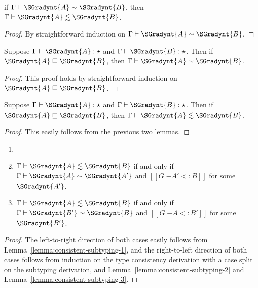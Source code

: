 \begin{lemma}
  \label{lemma:consistent-subtyping-3}
  if $ \Gamma  \vdash  \SGradynt{A}  \sim  \SGradynt{B} $, then $ \Gamma  \vdash  \SGradynt{A}  \lesssim  \SGradynt{B} $.
\end{lemma}
\begin{proof}
  By straightforward induction on $ \Gamma  \vdash  \SGradynt{A}  \sim  \SGradynt{B} $.
\end{proof}

\begin{lemma}
  \label{lemma:type_precision_and_consistency}
  Suppose $ \Gamma  \vdash  \SGradynt{A}  : \star $ and $ \Gamma  \vdash  \SGradynt{B}  : \star $.  Then
  if $ \SGradynt{A}  \sqsubseteq  \SGradynt{B} $, then $ \Gamma  \vdash  \SGradynt{A}  \sim  \SGradynt{B} $.
\end{lemma}
\begin{proof}
  This proof holds by straightforward induction on $ \SGradynt{A}  \sqsubseteq  \SGradynt{B} $.
\end{proof}

\begin{corollary}
  \label{corollary:type_precision_and_subtyping}
  Suppose $ \Gamma  \vdash  \SGradynt{A}  : \star $ and $ \Gamma  \vdash  \SGradynt{B}  : \star $.  Then
  if $ \SGradynt{A}  \sqsubseteq  \SGradynt{B} $, then $ \Gamma  \vdash  \SGradynt{A}  \lesssim  \SGradynt{B} $.
\end{corollary}
\begin{proof}
  This easily follows from the previous two lemmas.
\end{proof}


\begin{corollary}
  \label{corollary:consistent_subtyping}
  \begin{enumerate}[label=\roman*.,align=left]
  \item[]
  \item $ \Gamma  \vdash  \SGradynt{A}  \lesssim  \SGradynt{B} $ if and only if $ \Gamma  \vdash  \SGradynt{A}  \sim  \SGradynt{A'} $ and $[[G |- A' <: B]]$ for some $\SGradynt{A'}$.
  \item $ \Gamma  \vdash  \SGradynt{A}  \lesssim  \SGradynt{B} $ if and only if $ \Gamma  \vdash  \SGradynt{B'}  \sim  \SGradynt{B} $ and $[[G |- A <: B']]$ for some $\SGradynt{B'}$.
  \end{enumerate}
\end{corollary}
\begin{proof}
  The left-to-right direction of both cases easily follows from
  Lemma~\ref{lemma:consistent-subtyping-1}, and the right-to-left
  direction of both cases follows from induction on the type
  consistency derivation with a case split on the subtyping derivation,
  and Lemma~\ref{lemma:consistent-subtyping-2} and Lemma~\ref{lemma:consistent-subtyping-3}.
\end{proof}

